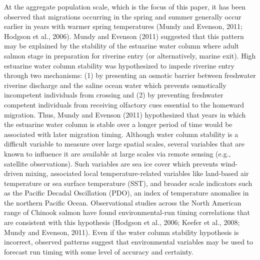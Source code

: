 \documentclass[12pt,]{book}
\theoremstyle{definition}
\theoremstyle{definition}
\theoremstyle{definition}
\theoremstyle{remark}
\begin{document}
At the aggregate population scale, which is the focus of this paper, it
has been observed that migrations occurring in the spring and summer
generally occur earlier in years with warmer spring temperatures (Mundy
and Evenson, 2011; Hodgson et al., 2006). Mundy and Evenson (2011)
suggested that this pattern may be explained by the stability of the
estuarine water column where adult salmon stage in preparation for
riverine entry (or alternatively, marine exit). High estuarine water
column stability was hypothesized to impede riverine entry through two
mechanisms: (1) by presenting an osmotic barrier between freshwater
riverine discharge and the saline ocean water which prevents osmotically
incompetent individuals from crossing and (2) by preventing freshwater
competent individuals from receiving olfactory cues essential to the
homeward migration. Thus, Mundy and Evenson (2011) hypothesized that
years in which the estuarine water column is stable over a longer period
of time would be associated with later migration timing. Although water
column stability is a difficult variable to measure over large spatial
scales, several variables that are known to influence it are available
at large scales via remote sensing (e.g., satellite observations). Such
variables are sea ice cover which prevents wind-driven mixing,
associated local temperature-related variables like land-based air
temperature or sea surface temperature (SST), and broader scale
indicators such as the Pacific Decadal Oscillation (PDO), an index of
temperature anomalies in the northern Pacific Ocean. Observational
studies across the North American range of Chinook salmon have found
environmental-run timing correlations that are consistent with this
hypothesis (Hodgson et al., 2006; Keefer et al., 2008; Mundy and
Evenson, 2011). Even if the water column stability hypothesis is
incorrect, observed patterns suggest that environmental variables may be
used to forecast run timing with some level of accuracy and certainty.
\end{document}
